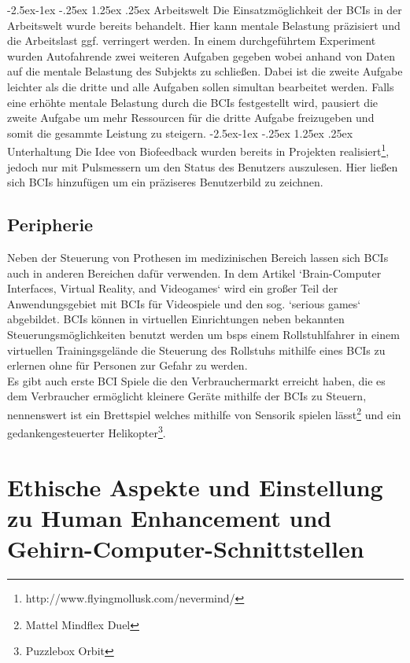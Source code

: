 \documentclass[11pt,ngerman,parskip=half]{scrartcl}
\makeatletter
\renewcommand\paragraph{\@startsection{paragraph}{4}{\z@}%
            {-2.5ex\@plus -1ex \@minus -.25ex}%
            {1.25ex \@plus .25ex}%
            {\normalfont\normalsize\bfseries}}
\makeatother
\begin{document}
\paragraph{Arbeitswelt}
Die Einsatzmöglichkeit der BCIs in der Arbeitswelt wurde bereits behandelt\parencite{beyond,workload}. Hier kann mentale Belastung präzisiert und die Arbeitslast ggf. verringert werden.
In einem durchgeführtem Experiment\parencite[24.3]{workload} wurden Autofahrende zwei weiteren Aufgaben gegeben 
wobei anhand von Daten auf die mentale Belastung des Subjekts zu schließen. Dabei ist die zweite Aufgabe leichter als die 
dritte und alle Aufgaben sollen simultan bearbeitet werden. Falls eine erhöhte mentale Belastung durch die BCIs festgestellt wird, 
pausiert die zweite Aufgabe um mehr Ressourcen für die dritte Aufgabe freizugeben und somit die gesammte Leistung zu steigern.
\paragraph{Unterhaltung}
 Die Idee von Biofeedback wurden bereits in Projekten realisiert\footnote{http://www.flyingmollusk.com/nevermind/}, jedoch nur
  mit Pulsmessern um den Status des Benutzers auszulesen. Hier ließen sich BCIs hinzufügen um ein präziseres Benutzerbild zu zeichnen. 
\subsection{Peripherie}
Neben der Steuerung von Prothesen im medizinischen Bereich lassen sich BCIs auch in anderen Bereichen dafür verwenden. In dem Artikel `Brain-Computer Interfaces, Virtual Reality, and Videogames`\parencite{vidya}
 wird ein großer Teil der Anwendungsgebiet mit BCIs für Videospiele und den sog. `serious games` abgebildet. BCIs können in virtuellen Einrichtungen neben bekannten Steuerungsmöglichkeiten benutzt
  werden um bsps einem Rollstuhlfahrer in einem virtuellen Trainingsgelände die Steuerung des Rollstuhs mithilfe eines BCIs zu erlernen ohne für Personen zur Gefahr zu werden\parencite[S.3 ff.]{vidya}.\\
Es gibt auch erste BCI Spiele die den Verbrauchermarkt erreicht haben, die es dem Verbraucher ermöglicht kleinere Geräte mithilfe der BCIs zu Steuern, nennenswert ist ein Brettspiel
 welches mithilfe von Sensorik spielen lässt\footnote{Mattel Mindflex Duel} und ein gedankengesteuerter Helikopter\footnote{Puzzlebox Orbit}.
 
\section{Ethische Aspekte und Einstellung zu Human Enhancement und Gehirn-Computer-Schnittstellen}
\label{sec:kathrin}
\end{document}
